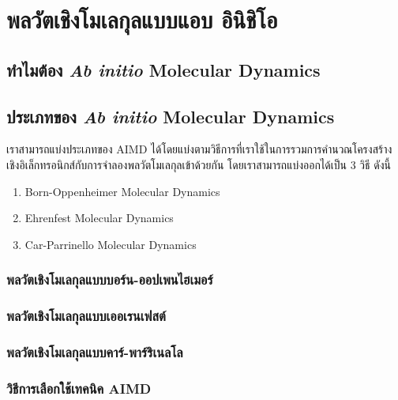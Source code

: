 

\chapter{พลวัตเชิงโมเลกุลแบบแอบ อินิชิโอ}
\label{ch:bomd}

\section{ทำไมต้อง \textit{Ab initio} Molecular Dynamics}


\section{ประเภทของ \textit{Ab initio} Molecular Dynamics}

เราสามารถแบ่งประเภทของ AIMD ได้โดยแบ่งตามวิธีการที่เราใช้ในการรวมการคำนวณโครงสร้างเชิงอิเล็กทรอนิกส์กับการจำลองพลวัตโมเลกุลเข้าด้วยกัน 
โดยเราสามารถแบ่งออกได้เป็น 3 วิธี ดังนี้ 

\begin{enumerate}
    \item Born-Oppenheimer Molecular Dynamics
    \item Ehrenfest Molecular Dynamics
    \item Car-Parrinello Molecular Dynamics
\end{enumerate}

\subsection{พลวัตเชิงโมเลกุลแบบบอร์น-ออปเพนไฮเมอร์}

\subsection{พลวัตเชิงโมเลกุลแบบเออเรนเฟสต์}

\subsection{พลวัตเชิงโมเลกุลแบบคาร์-พาร์ริเนลโล}

\subsection{วิธีการเลือกใช้เทคนิค AIMD}

